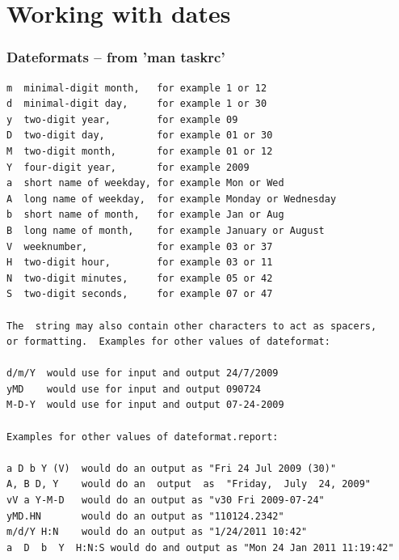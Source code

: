 \documentclass[t,handout]{beamer}
\begin{document}
\section{Working with dates}

\begin{frame}[fragile]\frametitle{Dateformats -- from 'man taskrc'}
\begin{lstlisting}
m  minimal-digit month,   for example 1 or 12
d  minimal-digit day,     for example 1 or 30
y  two-digit year,        for example 09
D  two-digit day,         for example 01 or 30
M  two-digit month,       for example 01 or 12
Y  four-digit year,       for example 2009
a  short name of weekday, for example Mon or Wed
A  long name of weekday,  for example Monday or Wednesday
b  short name of month,   for example Jan or Aug
B  long name of month,    for example January or August
V  weeknumber,            for example 03 or 37
H  two-digit hour,        for example 03 or 11
N  two-digit minutes,     for example 05 or 42
S  two-digit seconds,     for example 07 or 47

The  string may also contain other characters to act as spacers,
or formatting.  Examples for other values of dateformat:

d/m/Y  would use for input and output 24/7/2009
yMD    would use for input and output 090724
M-D-Y  would use for input and output 07-24-2009

Examples for other values of dateformat.report:

a D b Y (V)  would do an output as "Fri 24 Jul 2009 (30)"
A, B D, Y    would do an  output  as  "Friday,  July  24, 2009"
vV a Y-M-D   would do an output as "v30 Fri 2009-07-24"
yMD.HN       would do an output as "110124.2342"
m/d/Y H:N    would do an output as "1/24/2011 10:42"
a  D  b  Y  H:N:S would do and output as "Mon 24 Jan 2011 11:19:42"
\end{lstlisting}
\end{frame}
\end{document}

